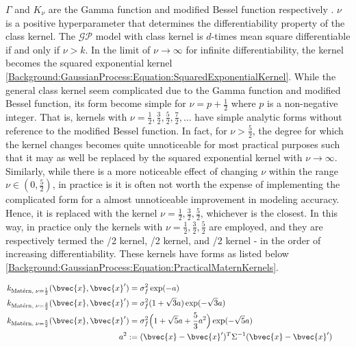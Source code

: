 			$\Gamma$ and $K_{\nu}$ are the Gamma function and modified Bessel function respectively \cite{GaussianProcessForMachineLearning}. $\nu$ is a positive hyperparameter that determines the differentiability property of the \matern class kernel. The $\mathcal{GP}$ model with \matern class kernel is $d$-times mean square differentiable if and only if $\nu > k$. In the limit of $\nu \rightarrow \infty$ for infinite differentiability, the \matern kernel becomes the squared exponential kernel \eqref{Background:GaussianProcess:Equation:SquaredExponentialKernel}. While the general \matern class kernel seem complicated due to the Gamma function and modified Bessel function, its form become simple for $\nu = p + \frac{1}{2}$ where $p$ is a non-negative integer. That is, \matern kernels with $\nu = \frac{1}{2}, \frac{3}{2}, \frac{5}{2}, \frac{7}{2}, \dots$ have simple analytic forms without reference to the modified Bessel function. In fact, for $\nu > \frac{5}{2}$, the degree for which the \matern kernel changes becomes quite unnoticeable for most practical purposes such that it may as well be replaced by the squared exponential kernel with $\nu \rightarrow \infty$. Similarly, while there is a more noticeable effect of changing $\nu$ within the range $\nu \in (0, \frac{5}{2})$, in practice is it is often not worth the expense of implementing the complicated form for a almost unnoticeable improvement in modeling accuracy. Hence, it is replaced with the \matern kernel $\nu = \frac{1}{2}, \frac{3}{2}, \frac{5}{2}$, whichever is the closest. In this way, in practice only the \matern kernels with $\nu = \frac{1}{2}, \frac{3}{2}, \frac{5}{2}$ are employed, and they are respectively termed the /2 kernel, /2 kernel, and /2 kernel - in the order of increasing differentiability. These kernels have forms as listed below \eqref{Background:GaussianProcess:Equation:PracticalMaternKernels}.
			
			\begin{equation}
				\left.
					\begin{aligned}
						k_{\mathrm{\maternmath}, \; \nu = \frac{1}{2}}(\bvec{x}, \bvec{x}') =& \; \sigma_{f}^{2} \exp ( -a ) \\
						k_{\mathrm{\maternmath}, \; \nu = \frac{3}{2}}(\bvec{x}, \bvec{x}') =& \; \sigma_{f}^{2} (1 + \sqrt{3} a) \exp ( -\sqrt{3} a ) \\
						k_{\mathrm{\maternmath}, \; \nu = \frac{5}{2}}(\bvec{x}, \bvec{x}') =& \; \sigma_{f}^{2} \Big(1 + \sqrt{5} a + \frac{5}{3} a^{2}\Big) \exp ( -\sqrt{5} a )  \\
						a^{2} :=& \; (\bvec{x} - \bvec{x}')^{T} \Sigma^{-1} (\bvec{x} - \bvec{x}')
					\end{aligned}
				\qquad \right.
			\label{Background:GaussianProcess:Equation:PracticalMaternKernels}
			\end{equation}			
			
